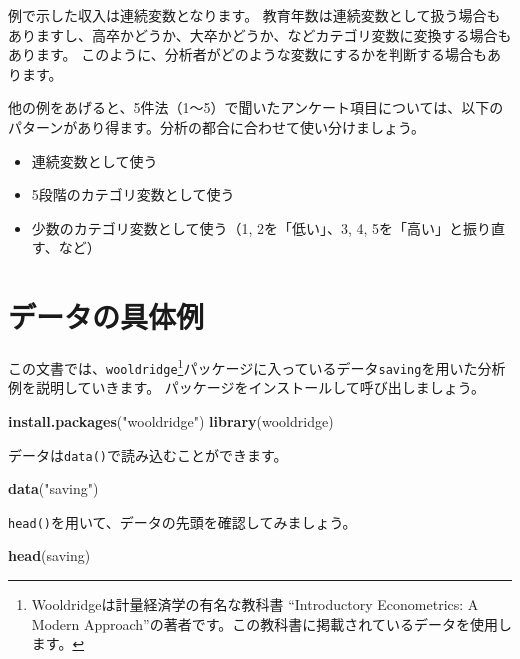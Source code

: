 \documentclass[]{book}
\newenvironment{Shaded}{\begin{snugshade}}{\end{snugshade}}
\newcommand{\KeywordTok}[1]{\textcolor[rgb]{0.13,0.29,0.53}{\textbf{#1}}}
\newcommand{\StringTok}[1]{\textcolor[rgb]{0.31,0.60,0.02}{#1}}
\newcommand{\NormalTok}[1]{#1}
\providecommand{\tightlist}{%
  \setlength{\itemsep}{0pt}\setlength{\parskip}{0pt}}
\begin{document}
例で示した収入は連続変数となります。
教育年数は連続変数として扱う場合もありますし、高卒かどうか、大卒かどうか、などカテゴリ変数に変換する場合もあります。
このように、分析者がどのような変数にするかを判断する場合もあります。

他の例をあげると、5件法（1〜5）で聞いたアンケート項目については、以下のパターンがあり得ます。分析の都合に合わせて使い分けましょう。

\begin{itemize}
\tightlist
\item
  連続変数として使う
\item
  5段階のカテゴリ変数として使う
\item
  少数のカテゴリ変数として使う（1, 2を「低い」、3, 4,
  5を「高い」と振り直す、など）
\end{itemize}

\section{データの具体例}\label{ux30c7ux30fcux30bfux306eux5177ux4f53ux4f8b}

この文書では、\texttt{wooldridge}\footnote{Wooldridgeは計量経済学の有名な教科書
  ``Introductory Econometrics: A Modern
  Approach''の著者です。この教科書に掲載されているデータを使用します。}パッケージに入っているデータ\texttt{saving}を用いた分析例を説明していきます。
パッケージをインストールして呼び出しましょう。

\begin{Shaded}
\begin{Highlighting}[]
\KeywordTok{install.packages}\NormalTok{(}\StringTok{"wooldridge"}\NormalTok{)}
\KeywordTok{library}\NormalTok{(wooldridge)}
\end{Highlighting}
\end{Shaded}

データは\texttt{data()}で読み込むことができます。

\begin{Shaded}
\begin{Highlighting}[]
\KeywordTok{data}\NormalTok{(}\StringTok{"saving"}\NormalTok{)}
\end{Highlighting}
\end{Shaded}

\texttt{head()}を用いて、データの先頭を確認してみましょう。

\begin{Shaded}
\begin{Highlighting}[]
\KeywordTok{head}\NormalTok{(saving)}
\end{Highlighting}
\end{Shaded}
\end{document}
